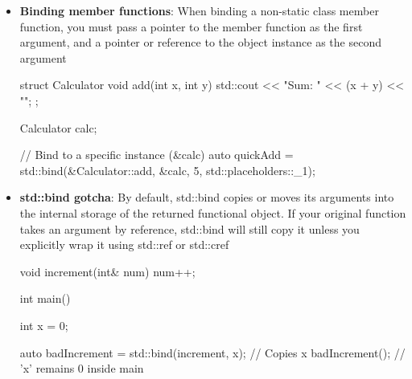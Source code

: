 \documentclass{report}
\begin{document}
\begin{itemize}
\begin{cppcode}
                void printValues(int a, int b, int c) {
                    std::cout << "a: " << a << ", b: " << b << ", c: " << c << "\n";
                }

                using namespace std::placeholders;

                auto boundFunc = std::bind(printValues, 10, _1, _2);

                // Call site: 20 maps to _1, 30 maps to _2
                boundFunc(20, 30); // Output: a: 10, b: 20, c: 30
            \end{cppcode}
            \bigbreak \noindent 
            You can also reorder arguments using placeholders
            \bigbreak \noindent 
            \begin{cppcode}
                auto reorderedFunc = std::bind(printValues, _2, _1, 99);
                reorderedFunc(5, 15); // Output: a: 15, b: 5, c: 99
            \end{cppcode}
        \item \textbf{Binding member functions}: When binding a non-static class member function, you must pass a pointer to the member function as the first argument, and a pointer or reference to the object instance as the second argument
            \bigbreak \noindent 
            \begin{cppcode}
                struct Calculator {
                    void add(int x, int y) {
                        std::cout << "Sum: " << (x + y) << "\n";
                    }
                };

                Calculator calc;
    
                // Bind to a specific instance (&calc)
                auto quickAdd = std::bind(&Calculator::add, &calc, 5, std::placeholders::_1);
            \end{cppcode}
        \item \textbf{std::bind gotcha}: By default, std::bind copies or moves its arguments into the internal storage of the returned functional object. If your original function takes an argument by reference, std::bind will still copy it unless you explicitly wrap it using std::ref or std::cref
            \bigbreak \noindent 
            \begin{cppcode}
                void increment(int& num) { num++; }

                int main() {
                    int x = 0;

                    auto badIncrement = std::bind(increment, x); // Copies x
                    badIncrement(); // 'x' remains 0 inside main

}
\end{cppcode}
\end{itemize}
\end{document}
